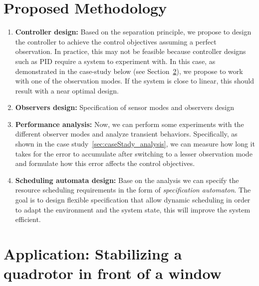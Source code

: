 \documentclass{sig-alternate-ipsn13}
\begin{document}
\section{Proposed Methodology}
\begin{enumerate}
    
    \item \textbf{Controller design:} Based on the separation principle, we propose to design the controller to achieve the control objectives assuming a perfect observation. In practice, this may not be feasible because controller designs such as PID require a system to experiment with. In this case, as demonstrated in the case-study below (see Section~\ref{sec:caseStady}), we propose to work with one of the observation modes. If the system is close to linear, this should result with a near optimal design.
    
    \item \textbf{Observers design:} Specification of sensor modes and observers design
    
    \item \textbf{Performance analysis:} Now, we can perform some experiments with the different observer modes and analyze transient behaviors. Specifically, as shown in the case study~\ref{sec:caseStady_analysis}, we can measure how long it takes for the error to accumulate after switching to a lesser observation mode and formulate how this error affects the control objectives.

    \item \textbf{Scheduling automata design:} Base on the analysis we can specify the resource scheduling requirements in the form of \textit{specification automaton}. The goal is to design flexible specification that allow dynamic scheduling in order to adapt the environment and the system state, this will improve the system efficient.

\end{enumerate}


\section{Application: Stabilizing a quadrotor in front of a window}
\label{sec:caseStady}
\end{document}

